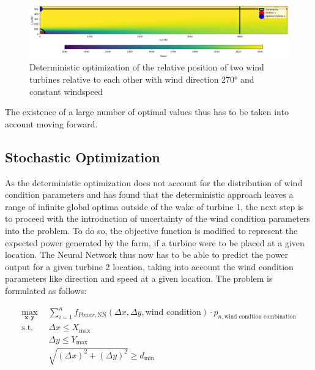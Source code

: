 \begin{figure}[h] 
	\centering
	\includegraphics[width=1\textwidth]{../figures/optimization/opti_determ270.png} 
	\caption{Deterministic optimization of the relative position of two wind turbines relative to each other with wind direction 270° and constant windspeed}
	\label{fig:opti_determ270}
\end{figure}

The existence of a large number of optimal values thus has to be taken into account moving forward.

\subsection{Stochastic Optimization} \label{sec:stoch_opti_1}

As the deterministic optimization does not account for the distribution of wind condition parameters and has found that the deterministic approach leaves a range of infinite global optima outside of the wake of turbine 1, the next step is to proceed with the introduction of uncertainty of the wind condition parameters into the problem. To do so, the objective function is modified to represent the expected power generated by the farm, if a turbine were to be placed at a given location. The Neural Network thus now has to be able to predict the power output for a given turbine 2 location, taking into account the wind condition parameters like direction and speed at a given location. The problem is formulated as follows: 

\begin{align}
	\max_{\mathbf{x}, \mathbf{y}} &  \sum_{i=1}^{n} f_{Power,\text{NN}}(\Delta x, \Delta y, \text{wind condition})\cdot p_{n,\text{wind condtion combination}} \\
	\text{s.t.} \quad 
	&  \Delta x \leq X_{\max} \\
	&  \Delta y \leq Y_{\max} \\
	& \sqrt{(\Delta x)^2 + (\Delta y)^2} \geq d_{\min}
\end{align}

